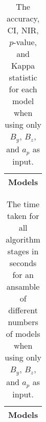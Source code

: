 \begin{table}[!ht]
	\centering
	\begin{tabular}{|c|}
		\hline
		Models \\ \hline
	\end{tabular}
	\caption{The accuracy, CI, NIR, $p$-value, and Kappa statistic for each model when using only $B_{y}$, $B_{z}$, and $a_{p}$ as input.}
	\label{tab:time:ansamble:yzap}
\end{table}

\begin{table}[!ht]
	\centering
	\begin{tabular}{|c|}
		\hline
		Models \\ \hline
	\end{tabular}
	\caption{The time taken for all algorithm stages in seconds for an ansamble of different numbers of models when using only $B_{y}$, $B_{z}$, and $a_{p}$ as input.}
	\label{tab:time:ansamble:reverse:yzap}
\end{table}
